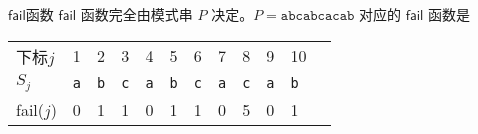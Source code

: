 \documentclass{ctexbeamer}
\newcommand{\str}[1]{\texttt{#1}}
\newcommand{\fail}{\mathsf{fail}}
\begin{document}
\begin{frame}{$\fail$函数}
$\fail$ 函数完全由模式串 $P$ 决定。$P=\str{abcabcacab}$ 对应的 $\fail$ 函数是

\begin{table}[]
\begin{tabular}{llllllllllll}
下标$j$ & 1  & 2  & 3 & 4 & 5 & 6 & 7 & 8 & 9 & 10 \\
$S_j$ & \str{a} & \str{b} & \str{c} & \str{a} & \str{b} & \str{c} & \str{a} & \str{c} & \str{a}  & \str{b} \\
fail($j$) & 0  & 1  & 1 & 0 & 1 & 1 & 0 & 5  & 0  & 1
\end{tabular}
\end{table}



\end{frame}
\end{document}
